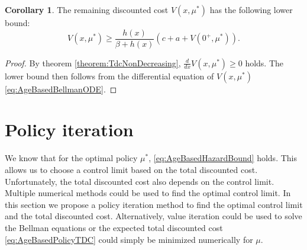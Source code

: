 \documentclass[a4paper]{thesis}
\theoremstyle{definition}
\newtheorem{corollary}{Corollary}[chapter]
\begin{document}
\begin{corollary}
	The remaining discounted cost $V(x,\mu^*)$ has the following lower bound:
	\[
	V(x,\mu^*)\geq\frac{h(x)}{\beta+ h(x)}(c+a+ V(0^+,\mu^*)).
	\]
	\begin{proof}
		By theorem \ref{theorem:TdcNonDecreasing}, $\frac{d}{dx}V(x,\mu^*)\geq 0$ holds.
		The lower bound then follows from the differential equation of $V(x,\mu^*)$ \ref{eq:AgeBasedBellmanODE}.
	\end{proof}
\end{corollary} \section{Policy iteration}\label{section:AgeBasedOptimalPolicyComputation}
We know that for the optimal policy $\mu^*$, \eqref{eq:AgeBasedHazardBound} holds.
This allows us to choose a control limit based on the total discounted cost.
Unfortunately, the total discounted cost also depends on the control limit.
Multiple numerical methods could be used to find the optimal control limit.
In this section we propose a policy iteration method to find the optimal control limit and the total discounted cost.
Alternatively, value iteration could be used to solve the Bellman equations or the expected total discounted cost \eqref{eq:AgeBasedPolicyTDC} could simply be minimized numerically for $\mu$.
\end{document}

